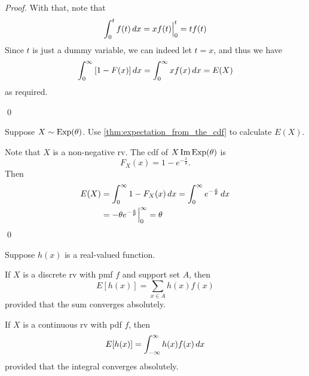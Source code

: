 \documentclass[notoc,notitlepage]{tufte-book}
\begin{document}
\begin{proof}
  With that, note that
  \begin{equation*}
    \int_{0}^{t} f(t) \mathop{}\!d{x} = x f(t) \Big|_{0}^{t} = tf(t)
  \end{equation*}
  Since $t$ is just a dummy variable, we can indeed let $t = x$, and thus we have
  \begin{equation*}
    \int_{0}^{\infty} \left[ 1 - F(x) \right] \mathop{}\!d{x} = \int_{0}^{\infty} xf(x) \mathop{}\!d{x} = E(X)
  \end{equation*}
  as required.

  \qed
\end{proof}

\begin{eg}[Example 2.20]
  Suppose $X \sim \operatorname{Exp}(\theta)$. Use \cref{thm:expectation_from_the_cdf} to calculate $E(X)$.

  \begin{solution}
    Note that $X$ is a non-negative rv. The cdf of $X \operatorname{Im} \operatorname{Exp}(\theta)$ is
    \begin{equation*}
      F_X (x) = 1 - e^{-\frac{x}{\theta}}.
    \end{equation*}
    Then
    \begin{align*}
      E(X) &= \int_{0}^{\infty} 1 - F_X(x) \mathop{}\!d{x} = \int_{0}^{\infty} e^{-\frac{x}{\theta}} \mathop{}\!d{x} \\
           &= -\theta e^{-\frac{x}{\theta}} \Big|_{0}^{\infty} = \theta
    \end{align*}\qed
  \end{solution}
\end{eg}

\begin{thm}
\label{thm:expected_value_of_a_function_of_x}
  Suppose $h(x)$ is a real-valued function.

  If $X$ is a discrete rv with pmf $f$ and support set $A$, then
  \begin{equation}\label{eq:discrete_function_to_expectation}
    E[ h(x) ] = \sum_{x \in A} h(x) f(x)
  \end{equation}
  provided that the sum converges absolutely.

  If $X$ is a continuous rv with pdf $f$, then
  \begin{equation}\label{eq:continous_function_to_expectation}
    E[ h(x) ] = \int_{-\infty}^{\infty} h(x) f(x) \mathop{}\!d{x}
  \end{equation}
  provided that the integral converges absolutely.
\end{thm}
\end{document}
